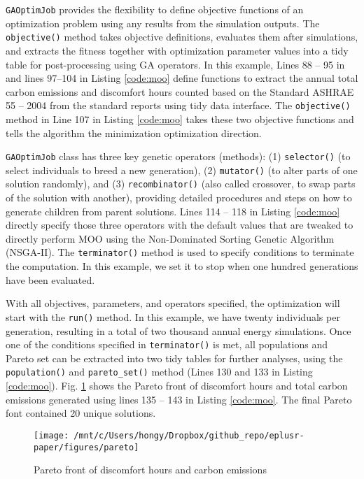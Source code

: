 \documentclass[3p, times]{elsarticle} %
\begin{document}
\texttt{GAOptimJob} provides the flexibility to define objective functions of an
optimization problem using any results from the simulation outputs. The
\texttt{objective()} method takes objective definitions, evaluates them after
simulations, and extracts the fitness together with optimization parameter
values into a tidy table for post-processing using GA operators. In this
example, Lines 88 -- 95 in and lines 97--104 in Listing \ref{code:moo} define
functions to extract the annual total carbon emissions and discomfort hours
counted based on the Standard ASHRAE 55 -- 2004 from the standard reports using
tidy data interface. The \texttt{objective()} method in Line 107 in Listing
\ref{code:moo} takes these two objective functions and tells the algorithm the
minimization optimization direction.

\texttt{GAOptimJob} class has three key genetic operators (methods): (1) \texttt{selector()}
(to select individuals to breed a new generation), (2) \texttt{mutator()} (to alter
parts of one solution randomly), and (3) \texttt{recombinator()} (also called
crossover, to swap parts of the solution with another), providing detailed
procedures and steps on how to generate children from parent solutions. Lines
114 -- 118 in Listing \ref{code:moo} directly specify those three operators
with the default values that are tweaked to directly perform MOO using the
Non-Dominated Sorting Genetic Algorithm (NSGA-II). The \texttt{terminator()} method is
used to specify conditions to terminate the computation. In this example, we set
it to stop when one hundred generations have been evaluated.

With all objectives, parameters, and operators specified, the optimization will
start with the \texttt{run()} method. In this example, we have twenty individuals per
generation, resulting in a total of two thousand annual energy simulations. Once
one of the conditions specified in \texttt{terminator()} is met, all populations and
Pareto set can be extracted into two tidy tables for further analyses, using the
\texttt{population()} and \texttt{pareto\_set()} method (Lines 130 and 133 in Listing
\ref{code:moo}). Fig. \ref{fig:pareto} shows the Pareto front of discomfort
hours and total carbon emissions generated using lines 135 -- 143 in Listing
\ref{code:moo}. The final Pareto font contained 20 unique solutions.

\begin{figure}[!htb]
\texttt{[image: /mnt/c/Users/hongy/Dropbox/github\_repo/eplusr-paper/figures/pareto]} \caption{Pareto front of discomfort hours and carbon emissions}\label{fig:pareto}
\end{figure}
\end{document}
